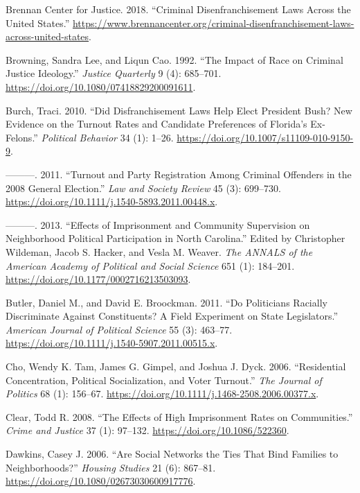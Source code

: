 \documentclass[12pt,]{article}
\begin{document}
\leavevmode\hypertarget{ref-bcj_laws}{}%
Brennan Center for Justice. 2018. ``Criminal Disenfranchisement Laws Across the United States.'' \url{https://www.brennancenter.org/criminal-disenfranchisement-laws-across-united-states}.

\leavevmode\hypertarget{ref-Browning1992}{}%
Browning, Sandra Lee, and Liqun Cao. 1992. ``The Impact of Race on Criminal Justice Ideology.'' \emph{Justice Quarterly} 9 (4): 685--701. \url{https://doi.org/10.1080/07418829200091611}.

\leavevmode\hypertarget{ref-Burch2010}{}%
Burch, Traci. 2010. ``Did Disfranchisement Laws Help Elect President Bush? New Evidence on the Turnout Rates and Candidate Preferences of Florida's Ex-Felons.'' \emph{Political Behavior} 34 (1): 1--26. \url{https://doi.org/10.1007/s11109-010-9150-9}.

\leavevmode\hypertarget{ref-Burch2011}{}%
---------. 2011. ``Turnout and Party Registration Among Criminal Offenders in the 2008 General Election.'' \emph{Law and Society Review} 45 (3): 699--730. \url{https://doi.org/10.1111/j.1540-5893.2011.00448.x}.

\leavevmode\hypertarget{ref-Burch2013}{}%
---------. 2013. ``Effects of Imprisonment and Community Supervision on Neighborhood Political Participation in North Carolina.'' Edited by Christopher Wildeman, Jacob S. Hacker, and Vesla M. Weaver. \emph{The ANNALS of the American Academy of Political and Social Science} 651 (1): 184--201. \url{https://doi.org/10.1177/0002716213503093}.

\leavevmode\hypertarget{ref-Butler2011}{}%
Butler, Daniel M., and David E. Broockman. 2011. ``Do Politicians Racially Discriminate Against Constituents? A Field Experiment on State Legislators.'' \emph{American Journal of Political Science} 55 (3): 463--77. \url{https://doi.org/10.1111/j.1540-5907.2011.00515.x}.

\leavevmode\hypertarget{ref-Cho2006}{}%
Cho, Wendy K. Tam, James G. Gimpel, and Joshua J. Dyck. 2006. ``Residential Concentration, Political Socialization, and Voter Turnout.'' \emph{The Journal of Politics} 68 (1): 156--67. \url{https://doi.org/10.1111/j.1468-2508.2006.00377.x}.

\leavevmode\hypertarget{ref-Clear2008}{}%
Clear, Todd R. 2008. ``The Effects of High Imprisonment Rates on Communities.'' \emph{Crime and Justice} 37 (1): 97--132. \url{https://doi.org/10.1086/522360}.

\leavevmode\hypertarget{ref-Dawkins2006}{}%
Dawkins, Casey J. 2006. ``Are Social Networks the Ties That Bind Families to Neighborhoods?'' \emph{Housing Studies} 21 (6): 867--81. \url{https://doi.org/10.1080/02673030600917776}.
\end{document}

